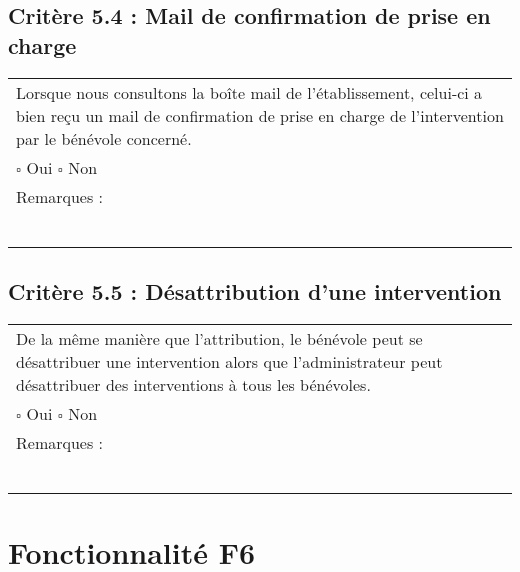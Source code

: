   	\subsection*{Critère 5.4 : Mail de confirmation de prise en charge}
  		\begin{center}
    	 		\begin{tabular}[h]{|p{}|}
			\hline
				Lorsque nous consultons la boîte mail de l'établissement, celui-ci a bien reçu un mail de confirmation de prise en charge de l'intervention par le bénévole concerné.\\
				
				$\square$ Oui  \hfill \hfill $\square$ Non \\\hline Remarques : \\ ~\\
			 \\\hline
     		\end{tabular}
  		\end{center}	
  		
  		
  	\subsection*{Critère 5.5 : Désattribution d'une intervention}
  		\begin{center}
    	 		\begin{tabular}[h]{|p{}|}
			\hline
				De la même manière que l'attribution, le bénévole peut se désattribuer une intervention alors que l'administrateur peut désattribuer des interventions à tous les bénévoles. \\
				
				$\square$ Oui  \hfill \hfill $\square$ Non \\\hline Remarques : \\ ~\\
			 \\\hline
     		\end{tabular}
  		\end{center}	
 
\section{Fonctionnalité F6}
